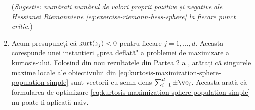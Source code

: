 \documentclass[../../book-main_ro.tex]{subfiles}
\begin{document}
\begin{exercise}
\begin{enumerate}
        (\textit{Sugestie: numărați numărul de valori proprii pozitive și negative ale Hessianei Riemanniene \eqref{eq:exercise-riemann-hess-sphere} la fiecare punct critic.})
        \item Acum presupuneți că $\mathop{\mathrm{kurt}}(z_j) < 0$ pentru fiecare $j =1, \dots, d$. Aceasta corespunde unei instanțieri „prea deflată" a problemei de maximizare a kurtosis-ului. Folosind din nou rezultatele din Partea 2 a , arătați că singurele maxime locale ale obiectivului din \eqref{eq:kurtosis-maximization-sphere-population-simple} sunt vectorii cu semn dens $\sum_{i=1}^d \pm \ve_i$.
        Aceasta arată că formularea de optimizare \eqref{eq:kurtosis-maximization-sphere-population-simple} nu poate fi aplicată naiv.
    \end{enumerate}
\end{exercise}
\end{document}
